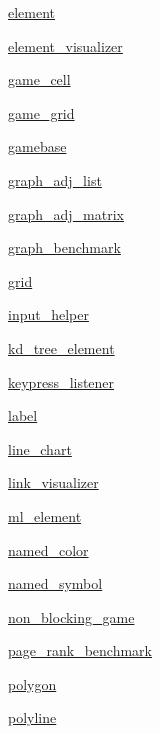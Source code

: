 \begin{DoxyCompactItemize}
 \mbox{\hyperlink{namespacebridges_1_1element}{element}}
\item 
 \mbox{\hyperlink{namespacebridges_1_1element__visualizer}{element\+\_\+visualizer}}
\item 
 \mbox{\hyperlink{namespacebridges_1_1game__cell}{game\+\_\+cell}}
\item 
 \mbox{\hyperlink{namespacebridges_1_1game__grid}{game\+\_\+grid}}
\item 
 \mbox{\hyperlink{namespacebridges_1_1gamebase}{gamebase}}
\item 
 \mbox{\hyperlink{namespacebridges_1_1graph__adj__list}{graph\+\_\+adj\+\_\+list}}
\item 
 \mbox{\hyperlink{namespacebridges_1_1graph__adj__matrix}{graph\+\_\+adj\+\_\+matrix}}
\item 
 \mbox{\hyperlink{namespacebridges_1_1graph__benchmark}{graph\+\_\+benchmark}}
\item 
 \mbox{\hyperlink{namespacebridges_1_1grid}{grid}}
\item 
 \mbox{\hyperlink{namespacebridges_1_1input__helper}{input\+\_\+helper}}
\item 
 \mbox{\hyperlink{namespacebridges_1_1kd__tree__element}{kd\+\_\+tree\+\_\+element}}
\item 
 \mbox{\hyperlink{namespacebridges_1_1keypress__listener}{keypress\+\_\+listener}}
\item 
 \mbox{\hyperlink{namespacebridges_1_1label}{label}}
\item 
 \mbox{\hyperlink{namespacebridges_1_1line__chart}{line\+\_\+chart}}
\item 
 \mbox{\hyperlink{namespacebridges_1_1link__visualizer}{link\+\_\+visualizer}}
\item 
 \mbox{\hyperlink{namespacebridges_1_1ml__element}{ml\+\_\+element}}
\item 
 \mbox{\hyperlink{namespacebridges_1_1named__color}{named\+\_\+color}}
\item 
 \mbox{\hyperlink{namespacebridges_1_1named__symbol}{named\+\_\+symbol}}
\item 
 \mbox{\hyperlink{namespacebridges_1_1non__blocking__game}{non\+\_\+blocking\+\_\+game}}
\item 
 \mbox{\hyperlink{namespacebridges_1_1page__rank__benchmark}{page\+\_\+rank\+\_\+benchmark}}
\item 
 \mbox{\hyperlink{namespacebridges_1_1polygon}{polygon}}
\item 
 \mbox{\hyperlink{namespacebridges_1_1polyline}{polyline}}
\item 

\end{DoxyCompactItemize}

